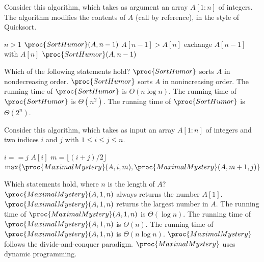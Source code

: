 Consider this algorithm, which takes as argument an array $A[1:n]$ of integers.
The algorithm modifies the contents of $A$ (call by reference), in the style of {\sc Quicksort}.

\begin{codebox}
  \li \If $n>1$ \Do
  \li $\proc{SortHumor}(A,n-1)$
  \li \If $A[n-1]>A[n]$ \Do
  \li exchange $A[n-1]$ with $A[n]$ \End
  \li $\proc{SortHumor}(A,n-1)$
  \End
\end{codebox}

\noindent
Which of the following statements hold?
\multipleanswers
\optionsstart
\answer $\proc{SortHumor}$ sorts $A$ in nondecreasing order. \correct
\answer $\proc{SortHumor}$ sorts $A$ in nonincreasing order.
\answer The running time of $\proc{SortHumor}$ is $\Theta(n \log n)$.
\answer The running time of $\proc{SortHumor}$ is $\Theta(n^2)$.
\answer The running time of $\proc{SortHumor}$ is $\Theta(2^n)$.\correct

\optionsend
{}



Consider this algorithm, which takes as input an array $A[1:n]$ of integers and two indices $i$ and $j$ with $1\leq i \leq j \leq n$.

\begin{codebox}
  \li \If $i==j$ \Do
  \li \Return $A[i]$ \End
  \li $m=\lfloor (i+j)/2\rfloor$
  \li \Return $\max\{\proc{MaximalMystery}(A,i,m),\proc{MaximalMystery}(A,m+1,j)\}$
\end{codebox}

\noindent
Which statements hold, where $n$ is the length of $A$?
\multipleanswers
\optionsstart
\answer $\proc{MaximalMystery}(A,1,n)$ always returns the number $A[1]$.
\answer $\proc{MaximalMystery}(A,1,n)$ returns the largest number in $A$. \correct
\answer The running time of $\proc{MaximalMystery}(A,1,n)$ is $\Theta(\log n)$.
\answer The running time of $\proc{MaximalMystery}(A,1,n)$ is $\Theta(n)$. \correct
\answer The running time of $\proc{MaximalMystery}(A,1,n)$ is $\Theta(n \log n)$.
\answer $\proc{MaximalMystery}$ follows the divide-and-conquer paradigm.\correct
\answer $\proc{MaximalMystery}$ uses dynamic programming.

